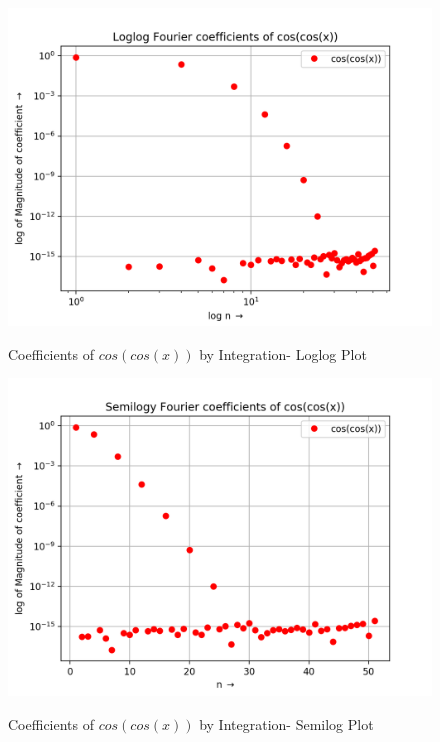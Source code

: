 \documentclass[11pt, a4paper]{article}
\begin{document}
\begin{figure}[H]
   	\centering
   	\includegraphics[scale=0.5]{loglog2t.png}
   	\label{fig:loglog2t}
   	\caption{Coefficients of $cos(cos(x))$ by Integration- Loglog Plot}
\end{figure}

\begin{figure}[H]
   	\centering
   	\includegraphics[scale=0.5]{semilog2t.png}
   	\label{fig:semilog2t}
   	\caption{Coefficients of $cos(cos(x))$ by Integration- Semilog Plot}
\end{figure}
\end{document}
